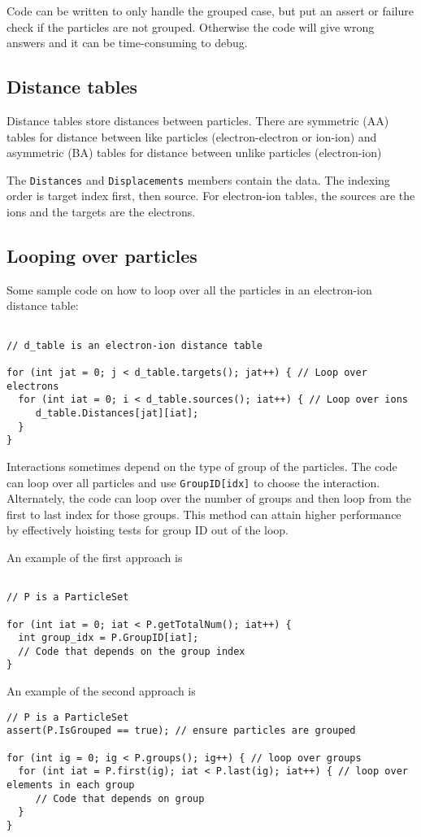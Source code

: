 Code can be written to only handle the grouped case, but put an assert or failure check if the particles are not grouped.  Otherwise the code will give wrong answers and it can be time-consuming to debug.

\subsection{Distance tables}

Distance tables store distances between particles.
There are symmetric (AA) tables for distance between like particles (electron-electron or ion-ion) and asymmetric (BA) tables for distance between unlike particles (electron-ion)

The \texttt{Distances} and \texttt{Displacements} members contain the data.
The indexing order is target index first, then source.
For electron-ion tables, the sources are the ions and the targets are the electrons.

\subsection{Looping over particles}

Some sample code on how to loop over all the particles in an electron-ion distance table:
\begin{verbatim}

// d_table is an electron-ion distance table

for (int jat = 0; j < d_table.targets(); jat++) { // Loop over electrons
  for (int iat = 0; i < d_table.sources(); iat++) { // Loop over ions
     d_table.Distances[jat][iat];
  }
}
\end{verbatim}

Interactions sometimes depend on the type of group of the particles.
The code can loop over all particles and use \texttt{GroupID[idx]} to choose the interaction.
Alternately, the code can loop over the number of groups and then loop from the first to last index for those groups.  This method can attain higher performance by effectively hoisting tests for group ID out of the loop.

An example of the first approach is
\begin{verbatim}

// P is a ParticleSet

for (int iat = 0; iat < P.getTotalNum(); iat++) {
  int group_idx = P.GroupID[iat];
  // Code that depends on the group index
}
\end{verbatim}


An example of the second approach is
\begin{verbatim}
// P is a ParticleSet
assert(P.IsGrouped == true); // ensure particles are grouped

for (int ig = 0; ig < P.groups(); ig++) { // loop over groups
  for (int iat = P.first(ig); iat < P.last(ig); iat++) { // loop over elements in each group
     // Code that depends on group
  }
}

\end{verbatim}


